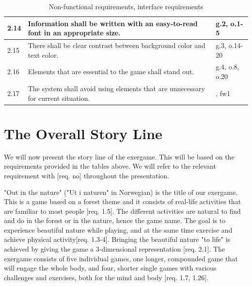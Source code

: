 \begin{table} [H]
\centering
\begin{tabular}{|>{\raggedright}p{}|p{}|p{}|} 
\hline
2.14 & Information shall be written with an easy-to-read font in an appropriate size. &  g.2, o.1-5\\ \hline
2.15 & There shall be clear contrast between background color and text color. & g.3, o.14-20 \\ \hline
2.16 & Elements that are essential to the game shall stand out. & g.4, o.8, o.20\\ \hline
2.17 & The system shall avoid using elements that are unnecessary for current situation.  & \cite{sweetser}, fw1\\ \hline
\end{tabular}
\caption[Non-functional requirements, part 2]{Non-functional requirements, interface requirements}
\label{tab:nonfunc2}
\end{table} 

\section{The Overall Story Line}
\label{sec:outinthenature}
We will now present the story line of the exergame. This will be based on the requirements provided in the tables above. We will refer to the relevant requirement with [req. no] throughout the presentation. 

"Out in the nature" ("Ut i naturen" in Norwegian) is the title of our exergame. This is a game based on a forest theme and it consists of real-life activities that are familiar to most people [req. 1.5]. The different activities are natural to find and do in the forest or in the nature, hence the game name. The goal is to experience beautiful nature while playing, and at the same time exercise and achieve physical activity[req. 1.3-4]. Bringing the beautiful nature "to life" is achieved by giving the game a 3-dimensional representation [req. 2.1]. The exergame consists of five individual games, one longer, compounded game that will engage the whole body, and four, shorter single games with various challenges and exercises, both for the mind and body [req. 1.7, 1.26].        

